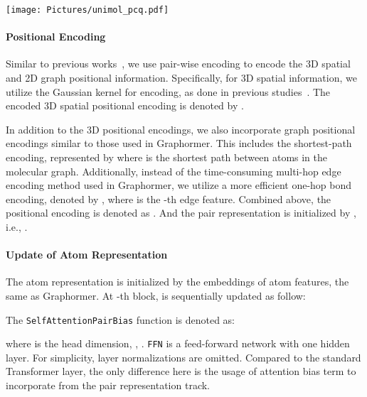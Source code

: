 \documentclass{article}
\newcommand{\name}{\texttt{Uni-Mol+}\xspace}
\newcommand{\sa}{\texttt{SelfAttentionPairBias}\xspace}
\newcommand{\ffn}{\texttt{FFN}\xspace}
\begin{document}
 \begin{figure*}[!tbp]
\centering
\texttt{[image: Pictures/unimol\_pcq.pdf]}
\vspace{-10pt}
\caption{The \name  backbone consists of  blocks, each of which maintains two tracks of representations - atom and pair, initialized by atom features and 2D graph/3D conformation, respectively. These representations communicate with each other at every block. Based on this backbone model, \name iteratively updates the raw conformation (i.e., 3D coordinates of atoms) towards the DFT equilibrium conformation for  iterations.} \label{fig:model}
\end{figure*}

\vspace{-6pt}
\paragraph{Positional Encoding}
Similar to previous works~\cite{ying2021transformers, zhou2022uni}, we use pair-wise encoding to encode the 3D spatial and 2D graph positional information. Specifically, for 3D spatial information, we utilize the Gaussian kernel for encoding, as done in previous studies~\cite{shi2022benchmarking, zhou2022uni}. The encoded 3D spatial positional encoding is denoted by .

In addition to the 3D positional encodings, we also incorporate graph positional encodings similar to those used in Graphormer. This includes the shortest-path encoding, represented by  where  is the shortest path between atoms  in the molecular graph. Additionally, instead of the time-consuming multi-hop edge encoding method used in Graphormer, we utilize a more efficient one-hop bond encoding, denoted by , where  is the -th edge feature. Combined above, the positional encoding is denoted as . And the pair representation  is initialized by , i.e., .

\vspace{-6pt}
\paragraph{Update of Atom Representation}
The atom representation  is initialized by the embeddings of atom features, the same as Graphormer. At -th block,  is sequentially updated as follow:


The \sa function is denoted as:


where  is the head dimension, ,  .
\ffn is a feed-forward network with one hidden layer.  For simplicity, layer normalizations are omitted. Compared to the standard Transformer layer, the only difference here is the usage of attention bias term  to incorporate  from the pair representation track.
\end{document}
